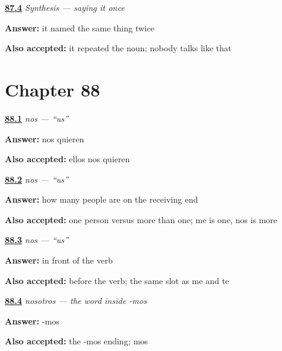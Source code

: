 \noindent\begin{minipage}[t]{\linewidth}
\raggedright
\hyperlink{review-ES-C42-sintesis-decirlo-una-vez-point}{\textbf{87.4}} \emph{Synthesis — saying it once}\par
\small \textbf{Answer:} it named the same thing twice\par
\footnotesize \textbf{Also accepted:} it repeated the noun; nobody talks like that
\end{minipage}\par\medskip

\section*{Chapter 88}

\noindent\begin{minipage}[t]{\linewidth}
\raggedright
\hyperlink{review-ES-C45-nos-say}{\textbf{88.1}} \emph{nos — \textquotedblleft{}us\textquotedblright{}}\par
\small \textbf{Answer:} nos quieren\par
\footnotesize \textbf{Also accepted:} ellos nos quieren
\end{minipage}\par\medskip

\noindent\begin{minipage}[t]{\linewidth}
\raggedright
\hyperlink{review-ES-C45-nos-count}{\textbf{88.2}} \emph{nos — \textquotedblleft{}us\textquotedblright{}}\par
\small \textbf{Answer:} how many people are on the receiving end\par
\footnotesize \textbf{Also accepted:} one person versus more than one; me is one, nos is more
\end{minipage}\par\medskip

\noindent\begin{minipage}[t]{\linewidth}
\raggedright
\hyperlink{review-ES-C45-nos-slot}{\textbf{88.3}} \emph{nos — \textquotedblleft{}us\textquotedblright{}}\par
\small \textbf{Answer:} in front of the verb\par
\footnotesize \textbf{Also accepted:} before the verb; the same slot as me and te
\end{minipage}\par\medskip

\noindent\begin{minipage}[t]{\linewidth}
\raggedright
\hyperlink{review-ES-C45-nosotros-ending}{\textbf{88.4}} \emph{nosotros — the word inside -mos}\par
\small \textbf{Answer:} -mos\par
\footnotesize \textbf{Also accepted:} the -mos ending; mos
\end{minipage}\par\medskip

